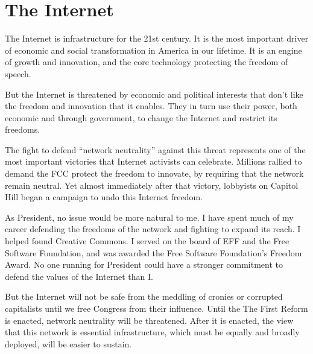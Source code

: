 \section{The Internet}

The Internet is infrastructure for the 21st century. It is the most important driver of economic and social transformation in America in our lifetime. It is an engine of growth and innovation, and the core technology protecting the freedom of speech.

But the Internet is threatened by economic and political interests that don't like the freedom and innovation that it enables. They in turn use their power, both economic and through government, to change the Internet and restrict its freedoms.

The fight to defend ``network neutrality'' against this threat represents one of the most important victories that Internet activists can celebrate. Millions rallied to demand the FCC protect the freedom to innovate, by requiring that the network remain neutral. Yet almost immediately after that victory, lobbyists on Capitol Hill began a campaign to undo this Internet freedom.

As President, no issue would be more natural to me. I have spent much of my career defending the freedoms of the network and fighting to expand its reach. I helped found Creative Commons. I served on the board of EFF and the Free Software Foundation, and was awarded the Free Software Foundation's Freedom Award. No one running for President could have a stronger commitment to defend the values of the Internet than I.

But the Internet will not be safe from the meddling of cronies or corrupted capitalists until we free Congress from their influence. Until the The First Reform is enacted, network neutrality will be threatened. After it is enacted, the view that this network is essential infrastructure, which must be equally and broadly deployed, will be easier to sustain.
